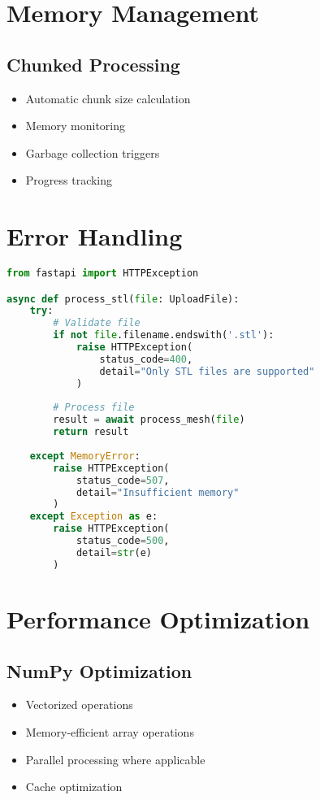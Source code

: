 \section{Memory Management}
\subsection{Chunked Processing}
\begin{itemize}
    \item Automatic chunk size calculation
    \item Memory monitoring
    \item Garbage collection triggers
    \item Progress tracking
\end{itemize}

\section{Error Handling}
\begin{lstlisting}[language=Python]
from fastapi import HTTPException

async def process_stl(file: UploadFile):
    try:
        # Validate file
        if not file.filename.endswith('.stl'):
            raise HTTPException(
                status_code=400,
                detail="Only STL files are supported"
            )
            
        # Process file
        result = await process_mesh(file)
        return result
        
    except MemoryError:
        raise HTTPException(
            status_code=507,
            detail="Insufficient memory"
        )
    except Exception as e:
        raise HTTPException(
            status_code=500,
            detail=str(e)
        )
\end{lstlisting}

\section{Performance Optimization}
\subsection{NumPy Optimization}
\begin{itemize}
    \item Vectorized operations
    \item Memory-efficient array operations
    \item Parallel processing where applicable
    \item Cache optimization
\end{itemize}

